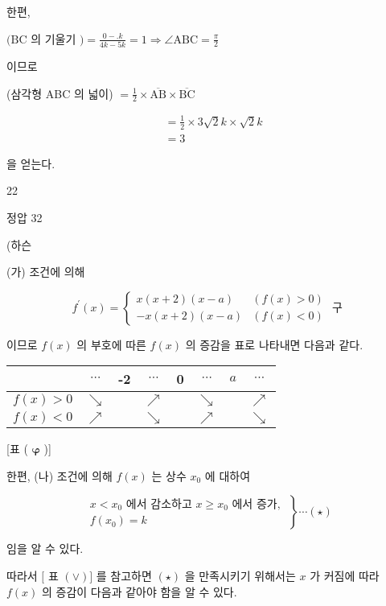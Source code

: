 \documentclass[10pt]{article}
\begin{document}
한편,

\((\mathrm{BC}\) 의 기울기 \()=\frac{0-. k}{4 k-5 k}=1 \Rightarrow \angle \mathrm{ABC}=\frac{\pi}{2}\)

이므로

(삼각형 ABC 의 넓이) \(=\frac{1}{2} \times \overline{\mathrm{AB}} \times \overline{\mathrm{BC}}\)

\[
\begin{aligned}
& =\frac{1}{2} \times 3 \sqrt{2} k \times \sqrt{2} k \\
& =3
\end{aligned}
\]

을 얻는다.

22

정압 32

(하슨

(가) 조건에 의해

\[
f^{\prime}(x)=\left\{\begin{array}{ll}
x(x+2)(x-a) & (f(x)>0) \\
-x(x+2)(x-a) & (f(x)<0)
\end{array}\right. \text { 구 }
\]

이므로 \(f(x)\) 의 부호에 따른 \(f(x)\) 의 증감을 표로 나타내면 다음과 같다.

\begin{center}
\begin{tabular}{|c|c|c|c|c|c|c|c|}
\hline
 & \(\cdots\) & -2 & \(\cdots\) & 0 & \(\cdots\) & \(a\) & \(\cdots\) \\
\hline
\(f(x)>0\) & \(\searrow\) &  & \(\nearrow\) &  & \(\searrow\) &  & \(\nearrow\) \\
\hline
\(f(x)<0\) & \(\nearrow\) &  & \(\searrow\) &  & \(\nearrow\) &  & \(\searrow\) \\
\hline
\end{tabular}
\end{center}

[표 ( \(\boldsymbol{\varphi}\) )]

한편, (나) 조건에 의해 \(f(x)\) 는 상수 \(x_{0}\) 에 대하여

\[
\left.\begin{array}{l}
x<x_{0} \text { 에서 감소하고 } x \geq x_{0} \text { 에서 증가, } \\
f\left(x_{0}\right)=k
\end{array}\right\} \cdots(\star)
\]

임을 알 수 있다.

따라서 \([\) 표 \((\boldsymbol{\vee})]\) 를 참고하면 \((\boldsymbol{\star})\) 을 만족시키기 위해서는 \(x\) 가 커짐에 따라 \(f(x)\) 의 증감이 다음과 같아야 함을 알 수 있다.
\end{document}

